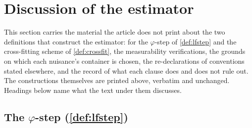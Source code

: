 %
%
%
%

\section*{Discussion of the estimator}

\noindent This section carries the material the article does not print about the two definitions that
construct the estimator: for the $\varphi$-step of \cref{def:lfstep} and the cross-fitting scheme of
\cref{def:crossfit}, the measurability verifications, the grounds on which each nuisance's container is
chosen, the re-declarations of conventions stated elsewhere, and the record of what each clause does and
does not rule out. The constructions themselves are printed above, verbatim and unchanged. Headings below
name what the text under them discusses.


\subsection*{The $\varphi$-step (\cref{def:lfstep})}

